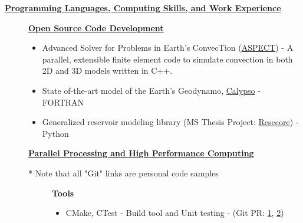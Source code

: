 \documentclass[11pt]{ltxdoc}
\begin{document}
\vskip 18pt

\begin{center}
	\textbf{\underline{Programming Languages, Computing Skills, and Work Experience}}
\end{center}

  \begin{description}
  	
    \item[] \textbf{\underline{Open Source Code Development}}
    
      \begin{itemize}
      	
        \item Advanced Solver for Problems in Earth's ConvecTion (\href{https://github.com/geodynamics/aspect}{ASPECT}) - A parallel, extensible finite element code to simulate convection in both 2D and 3D models written in C++.
      
      \item State of-the-art model of the Earth's Geodynamo,
      \href{https://geodynamics.org/cig/software/calypso/}{Calypso} - FORTRAN
      
      \item Generalized reservoir modeling library (MS Thesis Project: \href{https://github.com/hlokavarapu/resecore.git}{Resecore}) - Python
            
    \end{itemize}
                                            
    \item[] \textbf{\underline{Parallel Processing and High Performance Computing}}
          
      \vskip 06pt
      
      * Note that all "Git" links are personal code samples 
      
      \begin{description}
    
    	\item[] \textbf{Tools}
     
        \vskip 06pt   
        
        \begin{itemize} 
        
          \item CMake, CTest - Build tool and Unit testing - (Git PR: \href{https://github.com/hlokavarapu/computational_tools/tree/master/ASPECT_build_scripts}{1}, \href{https://github.com/geodynamics/calypso/pull/4}{2})
      

\end{itemize}
\end{description}
\end{description}
\end{document}
